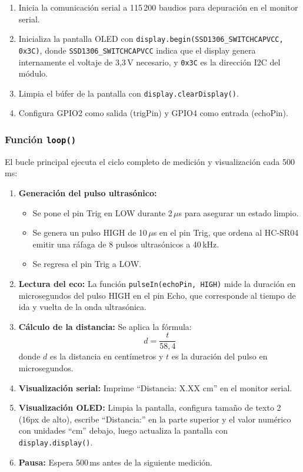 \documentclass[12pt,a4paper]{article}
\begin{document}
\begin{enumerate}
    \item Inicia la comunicación serial a 115\,200 baudios para depuración en el monitor serial.
    \item Inicializa la pantalla OLED con \texttt{display.begin(SSD1306\_SWITCHCAPVCC, 0x3C)}, donde \texttt{SSD1306\_SWITCHCAPVCC} indica que el display genera internamente el voltaje de 3,3\,V necesario, y \texttt{0x3C} es la dirección I2C del módulo.
    \item Limpia el búfer de la pantalla con \texttt{display.clearDisplay()}.
    \item Configura GPIO2 como salida (trigPin) y GPIO4 como entrada (echoPin).
\end{enumerate}

\subsubsection*{Función \texttt{loop()}}

El bucle principal ejecuta el ciclo completo de medición y visualización cada 500\,ms:

\begin{enumerate}
    \item \textbf{Generación del pulso ultrasónico:}
    \begin{itemize}
        \item Se pone el pin Trig en LOW durante 2\,$\mu$s para asegurar un estado limpio.
        \item Se genera un pulso HIGH de 10\,$\mu$s en el pin Trig, que ordena al HC-SR04 emitir una ráfaga de 8 pulsos ultrasónicos a 40\,kHz.
        \item Se regresa el pin Trig a LOW.
    \end{itemize}
    
    \item \textbf{Lectura del eco:} La función \texttt{pulseIn(echoPin, HIGH)} mide la duración en microsegundos del pulso HIGH en el pin Echo, que corresponde al tiempo de ida y vuelta de la onda ultrasónica.
    
    \item \textbf{Cálculo de la distancia:} Se aplica la fórmula:
    \begin{equation}
    d = \frac{t}{58{,}4}
    \label{eq:distancia}
    \end{equation}
    donde $d$ es la distancia en centímetros y $t$ es la duración del pulso en microsegundos.
    
    \item \textbf{Visualización serial:} Imprime ``Distancia: X.XX cm'' en el monitor serial.
    
    \item \textbf{Visualización OLED:} Limpia la pantalla, configura tamaño de texto 2 (16px de alto), escribe ``Distancia:'' en la parte superior y el valor numérico con unidades ``cm'' debajo, luego actualiza la pantalla con \texttt{display.display()}.
    
    \item \textbf{Pausa:} Espera 500\,ms antes de la siguiente medición.
\end{enumerate}
\end{document}
